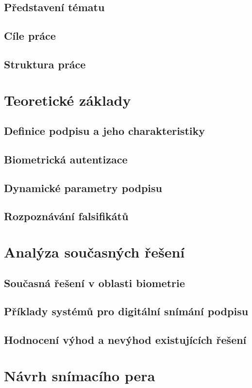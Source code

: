 \section{Představení tématu}
\section{Cíle práce}
\section{Struktura práce}

\chapter{Teoretické základy}
\section{Definice podpisu a jeho charakteristiky}
\section{Biometrická autentizace}
\section{Dynamické parametry podpisu}
\section{Rozpoznávání falsifikátů}

\chapter{Analýza současných řešení}
\section{Současná řešení v oblasti biometrie}
\section{Příklady systémů pro digitální snímání podpisu}
\section{Hodnocení výhod a nevýhod existujících řešení}

\chapter{Návrh snímacího pera}
